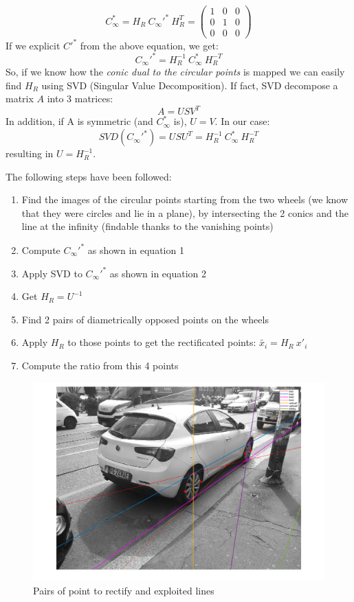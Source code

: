 \documentclass{article}
\begin{document}
$$ C_\infty^* = H_R \: C_\infty'^* \: H_R^T = \begin{pmatrix}
1 & 0 & 0 \\
0 & 1 & 0 \\
0 & 0 & 0
\end{pmatrix}$$
If we explicit $C'^*$ from the above equation, we get:
\begin{equation}
C_\infty'^* = H_R^{-1} \: C_\infty^* \: H_R^{-T}
\end{equation}
So, if we know how the \textit{conic dual to the circular points} is mapped we can easily find $H_R$ using SVD (Singular Value Decomposition).
If fact, SVD decompose a matrix $A$ into 3 matrices:
$$ A = USV^T $$
In addition, if A is symmetric (and $C_\infty^*$ is), $U=V$. In our case:
$$ SVD(C_\infty'^*) = USU^T = H_R^{-1} \: C_\infty^* \: H_R^{-T} $$
resulting in $U=H_R^{-1}$.

\vspace{6mm}
The following steps have been followed:
\begin{enumerate}
    \item Find the images of the circular points starting from the two wheels (we know that they were circles and lie in a plane), by intersecting the 2 conics and the line at the infinity (findable thanks to the vanishing points)
    \item Compute $ C_\infty'^* $ as shown in equation 1
    \item Apply SVD to $ C_\infty'^* $ as shown in equation 2
    \item Get $ H_R = U^{-1} $
    \item Find 2 pairs of diametrically opposed points on the wheels
    \item Apply $ H_R $ to those points to get the rectificated points:
          $ \tilde{x_i} = H_R \: x'_i $
    \item Compute the ratio from this 4 points
\end{enumerate}

\begin{figure}[h!]
\centering
\includegraphics[scale=0.35]{images/homework_10.png}
\caption{Pairs of point to rectify and exploited lines}
\label{fig:rectification}
\end{figure}
\end{document}
